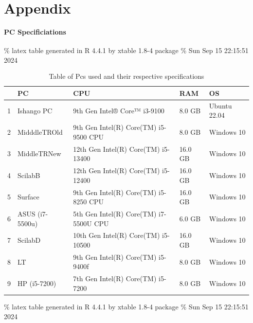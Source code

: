 \documentclass[12pt,halfline,a4paper,]{ouparticle}
\begin{document}
\newpage

\section{Appendix}\label{appendix}

\paragraph{PC Specificiations}\label{pc-specificiations}

\hfill\break

\% latex table generated in R 4.4.1 by xtable 1.8-4 package \% Sun Sep
15 22:15:51 2024

\begin{table}[ht]
\centering
\begin{tabular}{rllll}
  \hline
 & PC & CPU & RAM & OS \\ 
  \hline
1 & Ishango PC &  9th Gen Intel® Core™ i3-9100  &  8.0 GB  & Ubuntu 22.04 \\ 
  2 & MidddleTROld &  9th Gen Intel(R) Core(TM) i5-9500 CPU  &  8.0 GB  &   Windows 10 \\ 
  3 & MiddleTRNew  &  12th Gen Intel(R) Core(TM) i5-13400  &  16.0 GB  &   Windows 10 \\ 
  4 & ScilabB  &   12th Gen Intel(R) Core(TM) i5-12400  &   16.0 GB   &   Windows 10 \\ 
  5 & Surface  &   9th Gen Intel(R) Core(TM) i5-8250 CPU  &   16.0 GB   &   Windows 10 \\ 
  6 & ASUS (i7-5500u)  &   5th Gen Intel(R) Core(TM) i7-5500U CPU  &   6.0 GB   &   Windows 10 \\ 
  7 & ScilabD  &   10th Gen Intel(R) Core(TM) i5-10500  &   16.0 GB   &   Windows 10 \\ 
  8 & LT  &   9th Gen Intel(R) Core(TM) i5-9400f  &   8.0 GB   &   Windows 10 \\ 
  9 & HP (i5-7200)  &   7th Gen Intel(R) Core(TM) i5-7200  &   8.0 GB   &   Windows 10 \\ 
   \hline
\end{tabular}
\caption{Table of Pcs used and their respective specifications} 
\end{table}

\% latex table generated in R 4.4.1 by xtable 1.8-4 package \% Sun Sep
15 22:15:51 2024
\end{document}
